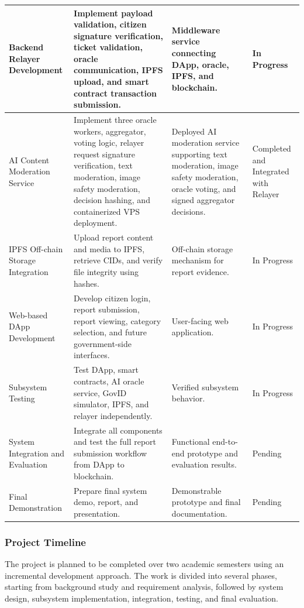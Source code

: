 \begin{longtable}{|p{3.2cm}|p{5.2cm}|p{4.2cm}|p{2.2cm}|}
Backend Relayer Development
& Implement payload validation, citizen signature verification, ticket validation, oracle communication, IPFS upload, and smart contract transaction submission.
& Middleware service connecting DApp, oracle, IPFS, and blockchain.
& In Progress \\
\hline

AI Content Moderation Service &
Implement three oracle workers, aggregator, voting logic, relayer request
signature verification, text moderation, image safety moderation, decision hashing,
and containerized VPS deployment. &
Deployed AI moderation service supporting text moderation, image safety
moderation, oracle voting, and signed aggregator decisions. &
Completed and Integrated with Relayer \\
\hline

IPFS Off-chain Storage Integration
& Upload report content and media to IPFS, retrieve CIDs, and verify file integrity using hashes.
& Off-chain storage mechanism for report evidence.
& In Progress \\
\hline

Web-based DApp Development
& Develop citizen login, report submission, report viewing, category selection, and future government-side interfaces.
& User-facing web application.
& In Progress \\
\hline

Subsystem Testing
& Test DApp, smart contracts, AI oracle service, GovID simulator, IPFS, and relayer independently.
& Verified subsystem behavior.
& In Progress \\
\hline

System Integration and Evaluation
& Integrate all components and test the full report submission workflow from DApp to blockchain.
& Functional end-to-end prototype and evaluation results.
& Pending \\
\hline

Final Demonstration
& Prepare final system demo, report, and presentation.
& Demonstrable prototype and final documentation.
& Pending \\
\hline

\end{longtable}
\clearpage

\subsubsection{Project Timeline}

The project is planned to be completed over two academic semesters using an incremental development approach. The work is divided into several phases, starting from background study and requirement analysis, followed by system design, subsystem implementation, integration, testing, and final evaluation.

